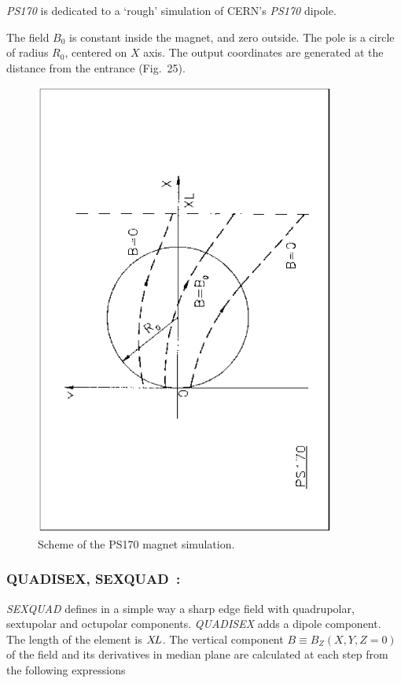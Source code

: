 \textsl{PS170} is dedicated to a `rough' simulation
of CERN's \textsl{PS170} dipole.  
\bigskip

\noindent The field $ B_0 $ is constant inside the magnet, and zero outside. 
The pole is a circle  of radius $ R_0 $, centered on $ X $ axis.  The output coordinates are
generated at the distance \textsl{\XL} from the entrance (Fig.~25).  %
\vfill

\begin{figure}[H]
\centerline{\includegraphics[height=15cm,angle=-90]{Fig25.ps}}
\caption{\label{fig25}Scheme of the PS170 magnet simulation.}
\end{figure}
\vfill

\newpage

\subsubsection*{QUADISEX, SEXQUAD~: \QUADISEXTitl} \label{QUADISEX}\label{SEXQUAD}
 

\textsl{SEXQUAD}    defines in a simple way a sharp edge field with quadrupolar, 
sextupolar and octupolar components. \textsl{QUADISEX}  adds a dipole component. The length of 
the element is $ X\!L $.  The vertical component $ B \equiv B_Z(X,Y,Z=0) $ of the field and its derivatives in median plane are 
calculated at each step from the following expressions 

